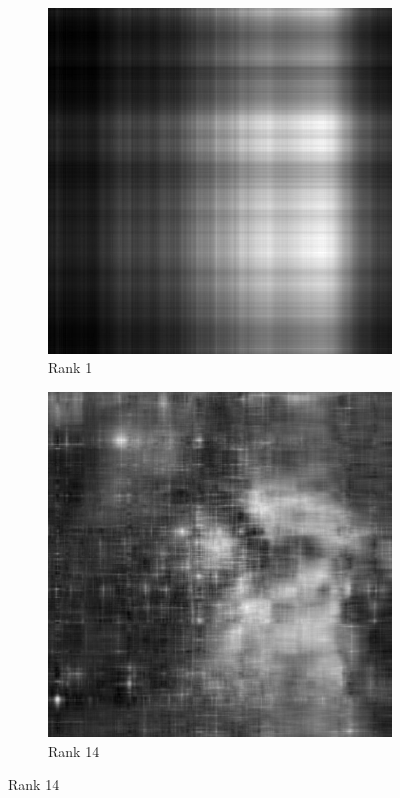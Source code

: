 \begin{figure}
\centering
\begin{subfigure}[b]{.25\textwidth}
\centering
\includegraphics[width=\textwidth]{rank1.jpg}
\caption{Rank 1}
\end{subfigure}
\begin{subfigure}[b]{.25\textwidth}
\centering
\includegraphics[width=\textwidth]{rank14.jpg}
\caption{Rank 14}
\end{subfigure}


\end{figure}
